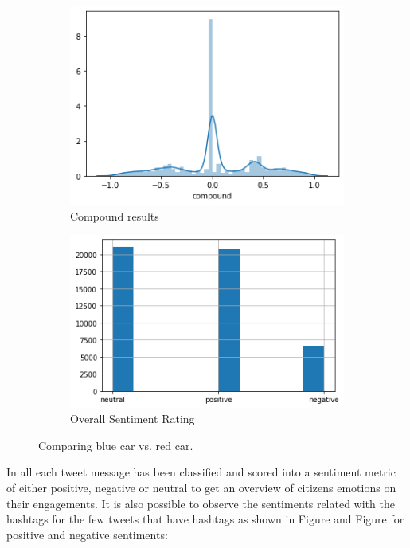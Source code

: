 \begin{figure}
      \centering
	    \begin{subfigure}{0.1\linewidth}
		\includegraphics[width=\linewidth]{postgrad_template 2/chapters/chapter3/Sentiment Compound 2.png}
		\caption{Compound results}
		\label{fig:subfig1}
	   \end{subfigure}
	   \vfill
	   \begin{subfigure}{0.1\linewidth}
	   \includegraphics[width=\linewidth]{postgrad_template 2/chapters/chapter3/Overall Serntiment 2.png}
	   \caption{Overall Sentiment Rating}
	   \label{fig:subfig2}
	   \end{subfigure}
	 \caption{Comparing blue car vs. red car.}
\end{figure}

In all each tweet message has been classified and scored into a sentiment metric of either positive, negative or neutral to get an overview of citizens emotions on their engagements.  It is also possible to observe the sentiments related with the hashtags for the few tweets that have hashtags as shown in Figure and Figure for positive and negative sentiments:\\

